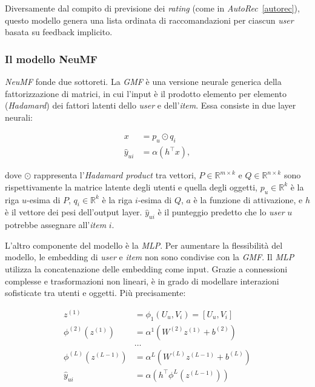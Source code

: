 Diversamente dal compito di previsione dei \textit{rating} (come in \textit{AutoRec}~\ref{autorec}), questo modello genera una lista ordinata di raccomandazioni per ciascun \textit{user} basata su feedback implicito.

\subsubsection{Il modello NeuMF}\label{neufm}

\textit{NeuMF} fonde due sottoreti. La \textit{GMF} è una versione neurale generica della fattorizzazione di matrici, in cui l'input è il prodotto elemento per elemento (\textit{Hadamard}) dei fattori latenti dello \textit{user} e dell'\textit{item}. Essa consiste in due layer neurali:

\[
\begin{split}
x &= p_u \odot q_i \\
\hat{y}_{ui} &= \alpha(h^\top x),
\end{split}
\]

dove $\odot$ rappresenta l'\textit{Hadamard product} tra vettori, $P \in \mathbb{R}^{m \times k}$ e $Q \in \mathbb{R}^{n \times k}$ sono rispettivamente la matrice latente degli utenti e quella degli oggetti, $p_u \in \mathbb{R}^{k}$ è la riga $u$-esima di $P$, $q_i \in \mathbb{R}^{ k}$ è la riga $i$-esima di $Q$, $a$ è la funzione di attivazione, e $h$ è il vettore dei pesi dell'output layer.  
$\hat{y}_{ui}$ è il punteggio predetto che lo \textit{user} $u$ potrebbe assegnare all'\textit{item} $i$.

L'altro componente del modello è la \textit{MLP}. Per aumentare la flessibilità del modello, le embedding di \textit{user} e \textit{item} non sono condivise con la \textit{GMF}. Il \textit{MLP} utilizza la concatenazione delle embedding come input. Grazie a connessioni complesse e trasformazioni non lineari, è in grado di modellare interazioni sofisticate tra utenti e oggetti. Più precisamente:

\[
\begin{aligned}
z^{(1)} &= \phi_1(U_u, V_i) = \left[ U_u, V_i \right] \\
\phi^{(2)}(z^{(1)}) &= \alpha^1(W^{(2)} z^{(1)} + b^{(2)}) \\
&\dots \\
\phi^{(L)}(z^{(L-1)}) &= \alpha^L(W^{(L)} z^{(L-1)} + b^{(L)}) \\
\hat{y}_{ui} &= \alpha(h^\top \phi^L(z^{(L-1)}))
\end{aligned}
\]


